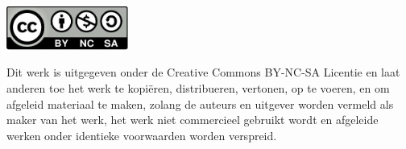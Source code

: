 
\includegraphics[width=0.3\textwidth]{CC-BY-SA-NC.png}

Dit werk is uitgegeven onder de Creative Commons BY-NC-SA Licentie en laat anderen toe het werk te kopi\"eren, distribueren, vertonen, op te voeren, en om afgeleid materiaal te maken, zolang de auteurs en uitgever worden vermeld als maker van het werk, het werk niet commercieel gebruikt wordt en afgeleide werken onder identieke voorwaarden worden verspreid.


